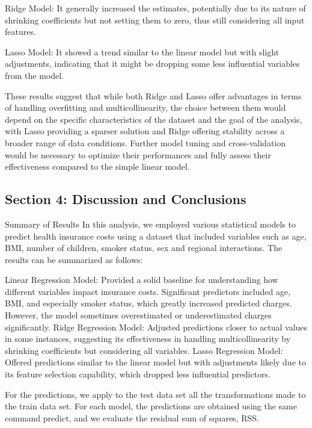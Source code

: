 \documentclass[
  12pt,
]{article}
\begin{document}
Ridge Model: It generally increased the estimates, potentially due to
its nature of shrinking coefficients but not setting them to zero, thus
still considering all input features.

Lasso Model: It showed a trend similar to the linear model but with
slight adjustments, indicating that it might be dropping some less
influential variables from the model.

These results suggest that while both Ridge and Lasso offer advantages
in terms of handling overfitting and multicollinearity, the choice
between them would depend on the specific characteristics of the dataset
and the goal of the analysis, with Lasso providing a sparser solution
and Ridge offering stability across a broader range of data conditions.
Further model tuning and cross-validation would be necessary to optimize
their performances and fully assess their effectiveness compared to the
simple linear model.

\newpage

\subsection{Section 4: Discussion and
Conclusions}\label{section-4-discussion-and-conclusions}

Summary of Results In this analysis, we employed various statistical
models to predict health insurance costs using a dataset that included
variables such as age, BMI, number of children, smoker status, sex and
regional interactions. The results can be summarized as follows:

Linear Regression Model: Provided a solid baseline for understanding how
different variables impact insurance costs. Significant predictors
included age, BMI, and especially smoker status, which greatly increased
predicted charges. However, the model sometimes overestimated or
underestimated charges significantly. Ridge Regression Model: Adjusted
predictions closer to actual values in some instances, suggesting its
effectiveness in handling multicollinearity by shrinking coefficients
but considering all variables. Lasso Regression Model: Offered
predictions similar to the linear model but with adjustments likely due
to its feature selection capability, which dropped less influential
predictors.

For the predictions, we apply to the test data set all the
transformations made to the train data set. For each model, the
predictions are obtained using the same command predict, and we evaluate
the residual sum of squares, RSS.
\end{document}

